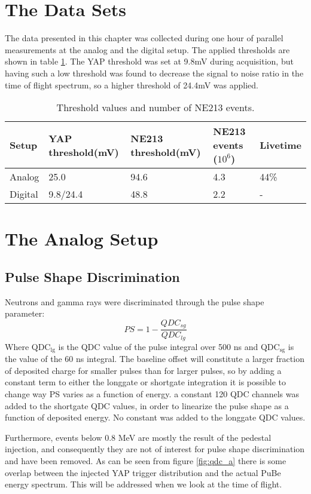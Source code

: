 \documentclass[main.tex]{subfiles}
\begin{document}
\section{The Data Sets}
The data presented in this chapter was collected during one hour of parallel measurements at the analog and the digital setup. The applied thresholds are shown in table \ref{tab:settings}. The YAP threshold was set at 9.8\si{\milli\volt} during acquisition, but having such a low threshold was found to decrease the signal to noise ratio in the time of flight spectrum, so a higher threshold of 24.4\si{\milli\volt} was applied.
\begin{table}[bh]
\begin{tabular}{|l|l|l|l|l|}
\hline
Setup   & YAP threshold(mV) & NE213 threshold(mV) & NE213 events ($\text{10}^\text{6}$) & Livetime \\ \hline
Analog  & 25.0              & 94.6                & 4.3      & 44\%             \\ \hline
Digital & 9.8/24.4	        & 48.8                & 2.2      & -             \\ \hline
\end{tabular}
\caption{Threshold values and number of NE213 events.}
\label{tab:settings}
\end{table}
\section{The Analog Setup}
\subsection{Pulse Shape Discrimination}
Neutrons and gamma rays were discriminated through the pulse shape parameter: 
\begin{equation}
PS=1-\frac{QDC_{sg}}{QDC_{lg}}
\end{equation}
Where QDC$_\text{lg}$ is the QDC value of the pulse integral over 500 ns and QDC$_\text{sg}$ is the value of the 60 ns integral. The baseline offset will constitute a larger fraction of deposited charge for smaller pulses than for larger pulses, so by adding a constant term to either the longgate or shortgate integration it is possible to change way PS varies as a function of energy. a constant 120 QDC channels was added to the shortgate QDC values, in order to linearize the pulse shape as a function of deposited energy. No constant was added to the longgate QDC values. 

Furthermore, events below 0.8 MeV are mostly the result of the pedestal injection, and consequently they are not of interest for pulse shape discrimination and have been removed. As can be seen from figure \ref{fig:qdc_a} there is some overlap between the injected YAP trigger distribution and the actual PuBe energy spectrum. This will be addressed when we look at the time of flight.
\end{document}
